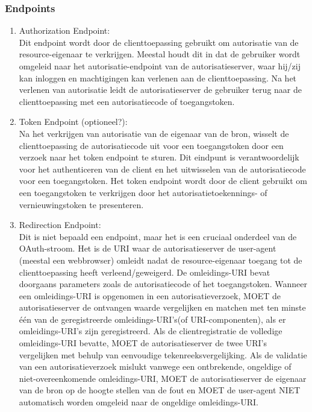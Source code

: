 \subsubsection{Endpoints}%
\label{subsubsec:endpoints}
\begin{enumerate}[label=\textbf{-}]
    \item Authorization Endpoint: \\
    Dit endpoint wordt door de clienttoepassing gebruikt om autorisatie van de resource-eigenaar te verkrijgen. Meestal houdt dit in dat de gebruiker wordt omgeleid naar het autorisatie-endpoint van de autorisatieserver, waar hij/zij kan inloggen en machtigingen kan verlenen aan de clienttoepassing. Na het verlenen van autorisatie leidt de autorisatieserver de gebruiker terug naar de clienttoepassing met een autorisatiecode of toegangstoken.
  
    \item Token Endpoint (optioneel?): \\
    Na het verkrijgen van autorisatie van de eigenaar van de bron, wisselt de clienttoepassing de autorisatiecode uit voor een toegangstoken door een verzoek naar het token endpoint te sturen. Dit eindpunt is verantwoordelijk voor het authenticeren van de client en het uitwisselen van de autorisatiecode voor een toegangstoken. Het token endpoint wordt door de client gebruikt om een toegangstoken te verkrijgen door het autorisatietoekennings- of vernieuwingstoken te presenteren.
  
    \item Redirection Endpoint: \\
    Dit is niet bepaald een endpoint, maar het is een cruciaal onderdeel van de OAuth-stroom. Het is de URI waar de autorisatieserver de user-agent (meestal een webbrowser) omleidt nadat de resource-eigenaar toegang tot de clienttoepassing heeft verleend/geweigerd. De omleidings-URI bevat doorgaans parameters zoals de autorisatiecode of het toegangstoken. Wanneer een omleidings-URI is opgenomen in een autorisatieverzoek, MOET de autorisatieserver de ontvangen waarde vergelijken en matchen met ten minste één van de geregistreerde omleidings-URI's(of URI-componenten), als er omleidings-URI's zijn geregistreerd. Als de clientregistratie de volledige omleidings-URI bevatte, MOET de autorisatieserver de twee URI's vergelijken met behulp van eenvoudige tekenreeksvergelijking. Als de validatie van een autorisatieverzoek mislukt vanwege een ontbrekende, ongeldige of niet-overeenkomende omleidings-URI, MOET de autorisatieserver de eigenaar van de bron op de hoogte stellen van de fout en MOET de user-agent NIET automatisch worden omgeleid naar de ongeldige omleidings-URI.
  \end{enumerate}

